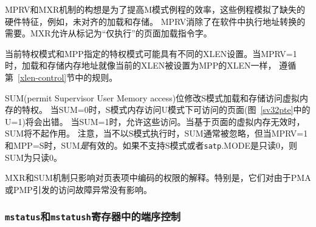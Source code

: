 \begin{commentary}
MPRV和MXR机制的构想是为了提高M模式例程的效率，这些例程模拟了缺失的硬件特征，例如，未对齐的加载和存储。
MPRV消除了在软件中执行地址转换的需要。MXR允许从标记为“仅执行”的页面加载指令字。

当前特权模式和MPP指定的特权模式可能具有不同的XLEN设置。当MPRV=1时，加载和存储内存地址就像当前的XLEN被设置为MPP的XLEN一样，
遵循第~\ref{xlen-control}节中的规则。
\end{commentary}

\iffalse
The SUM (permit Supervisor User Memory access) bit modifies the privilege with
which S-mode loads and stores access virtual memory.
When SUM=0, S-mode memory accesses to pages that are accessible by U-mode (U=1
in Figure~\ref{sv32pte}) will fault.  When SUM=1, these accesses are
permitted.  SUM has no effect when page-based virtual memory is not in effect.
Note that, while SUM is ordinarily ignored when not executing in S-mode, it
{\em is} in effect when MPRV=1 and MPP=S.  SUM is read-only 0 if S-mode is
not supported or if {\tt satp}.MODE is read-only~0.

The MXR and SUM mechanisms only affect the interpretation of permissions
encoded in page-table entries.  In particular, they have no impact on whether
access-fault exceptions are raised due to PMAs or PMP.
\fi

SUM(permit Supervisor User Memory access)位修改S模式加载和存储访问虚拟内存的特权。
当SUM=0时，S模式内存访问U模式下可访问的页面(图~\ref{sv32pte}中的U=1)将会出错。
当SUM=1时，允许这些访问。当基于页面的虚拟内存无效时，SUM将不起作用。
注意，当不以S模式执行时，SUM通常被忽略，但当MPRV=1和MPP=S时，SUM{\em 是}有效的。如果不支持S模式或者{\tt satp}.MODE是只读0，则SUM为只读0。

MXR和SUM机制只影响对页表项中编码的权限的解释。特别是，它们对由于PMA或PMP引发的访问故障异常没有影响。

\subsubsection{{\tt mstatus}和{\tt mstatush}寄存器中的端序控制}




